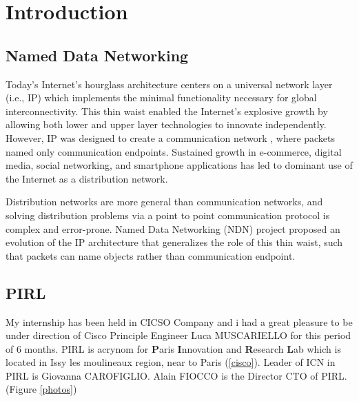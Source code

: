 
\chapter{Introduction} %

\label{Chapter1} %


\section{Named Data Networking}

Today's Internet's hourglass architecture centers on a
universal network layer (i.e., IP) which implements the minimal functionality  necessary  for  global interconnectivity. This thin  waist  enabled  the Internet's  explosive  growth  by  allowing both lower and upper layer technologies to innovate independently.  However, IP was designed to create a communication  network
, where  packets  named  only  communication endpoints.  Sustained growth in e-commerce, digital media, social networking, and smartphone applications has led to dominant use of the Internet as a distribution network.

Distribution networks are more general than communication
networks, and solving distribution problems via a point to point communication protocol is complex and error-prone.
Named Data Networking (NDN) project proposed an
evolution of the IP architecture that generalizes the role of this  thin  waist,  such  that  packets  can  name  objects  rather than  communication  endpoint.

\section{PIRL}

My internship has been held in CICSO Company and i had a great pleasure to be under direction of Cisco Principle Engineer Luca MUSCARIELLO  for this period of 6 months. PIRL is acrynom for \textbf{P}aris \textbf{I}nnovation and \textbf{R}esearch \textbf{L}ab which is located in Issy les moulineaux region, near to Paris (\ref{cisco}). Leader of ICN in PIRL is Giovanna CAROFIGLIO. Alain FIOCCO is the  Director CTO of PIRL. (Figure \ref{photos})


